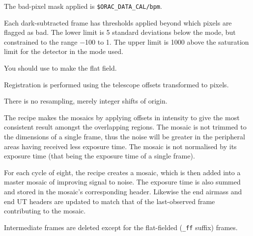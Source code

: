 \documentclass[twoside,11pt,nolof]{starlink}
\begin{document}
{{{         \sstitem
         The bad-pixel mask applied is {\tt\$ORAC\_DATA\_CAL/bpm}.

         \sstitem
         Each dark-subtracted frame has thresholds applied beyond which
         pixels are flagged as bad.  The lower limit is 5 standard
         deviations below the mode, but constrained to the range $-$100 to 1.
         The upper limit is 1000 above the saturation limit for the detector
         in the mode used.

         \sstitem
         You should use  to make the flat field.

         \sstitem
         Registration is performed using the telescope offsets
         transformed to pixels.

         \sstitem
         There is no resampling, merely integer shifts of origin.

         \sstitem
         The recipe makes the mosaics by applying offsets in intensity
         to give the most consistent result amongst the overlapping regions.
         The mosaic is not trimmed to the dimensions of a single frame, thus
         the noise will be greater in the peripheral areas having received
         less exposure time.  The mosaic is not normalised by its exposure
         time (that being the exposure time of a single frame).

         \sstitem
         For each cycle of eight, the recipe creates a mosaic, which is
         then added into a master mosaic of improving signal to noise.  The
         exposure time is also summed and stored in the mosaic's corresponding
         header.  Likewise the end airmass and end UT headers are updated to
         match that of the last-observed frame contributing to the mosaic.

         \sstitem
         Intermediate frames are deleted except for the flat-fielded ({\tt\_ff}
         suffix) frames.
      }
   }
   }
\end{document}
